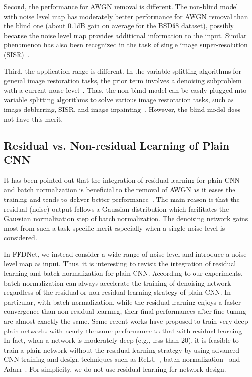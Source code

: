 \documentclass[journal]{IEEEtran}
\begin{document}
Second, the performance for AWGN removal is different. The non-blind model with noise level map has moderately better performance for AWGN removal than the blind one (about 0.1dB gain on average for the BSD68 dataset),
possibly because the noise level map provides additional information to the input.
Similar phenomenon has also been recognized in the task of single image super-resolution (SISR)~\cite{riegler2015conditioned}.

Third, the application range is different. In the variable splitting algorithms for general image restoration tasks,
the prior term involves a denoising subproblem with a current noise level~\cite{afonso2010fast,heide2014flexisp,romano2016little}.
Thus, the non-blind model can be easily plugged into variable splitting algorithms to solve various image restoration tasks, such as
image deblurring, SISR, and image inpainting~\cite{chan2016plug,zhang2017learning}. However, the blind model does not have this merit.

\subsection{Residual vs. Non-residual Learning of Plain CNN}\label{section_residual}

It has been pointed out that the integration of residual learning for plain CNN and batch normalization is beneficial to the removal of AWGN
as it eases the training and tends to deliver better performance~\cite{zhang2017beyond}.
The main reason is that the residual (noise) output follows a Gaussian distribution which facilitates the Gaussian normalization step of batch normalization.
The denoising network gains most from such a task-specific merit especially when a single noise level is considered.


In FFDNet, we instead consider a wide range of noise level and introduce a noise level map as input. Thus, it is interesting to revisit the integration of residual learning and batch normalization for plain CNN.
According to our experiments, batch normalization can always accelerate the training of denoising network regardless of the residual or non-residual learning strategy of plain CNN.
In particular, with batch normalization, while the residual learning enjoys a faster convergence than non-residual learning, their final performances after fine-tuning are almost exactly the same.
Some recent works have proposed to train very deep plain networks with nearly the same performance to that with residual learning~\cite{Zagoruyko2017diracnets,xie2017all}.
In fact, when a network is moderately deep (e.g., less than 20), it is feasible to train a plain network without the residual learning strategy by using advanced CNN training and design techniques such as ReLU~\cite{krizhevsky2012imagenet}, batch normalization~\cite{ioffe2015batch} and Adam~\cite{kingma2014adam}.
For simplicity, we do not use residual learning for network design.
\end{document}
